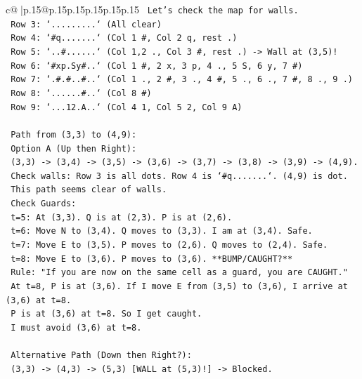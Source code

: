 \documentclass{article}
\begin{document}
{\begin{supertabular}{c@{$\;$}|p{.15\linewidth}@{}p{.15\linewidth}p{.15\linewidth}p{.15\linewidth}p{.15\linewidth}p{.15\linewidth}}
{{{\texttt{  Let's check the map for walls.} \\
\texttt{  Row 3: `.........` (All clear)} \\
\texttt{  Row 4: `\#q.......` (Col 1 \#, Col 2 q, rest .)} \\
\texttt{  Row 5: `..\#......` (Col 1,2 ., Col 3 \#, rest .) {-}> Wall at (3,5)!} \\
\texttt{  Row 6: `\#xp.Sy\#..` (Col 1 \#, 2 x, 3 p, 4 ., 5 S, 6 y, 7 \#)} \\
\texttt{  Row 7: `.\#.\#..\#..` (Col 1 ., 2 \#, 3 ., 4 \#, 5 ., 6 ., 7 \#, 8 ., 9 .)} \\
\texttt{  Row 8: `......\#..` (Col 8 \#)} \\
\texttt{  Row 9: `...12.A..` (Col 4 1, Col 5 2, Col 9 A)} \\
\\ 
\texttt{  Path from (3,3) to (4,9):} \\
\texttt{  Option A (Up then Right):} \\
\texttt{  (3,3) {-}> (3,4) {-}> (3,5) {-}> (3,6) {-}> (3,7) {-}> (3,8) {-}> (3,9) {-}> (4,9).} \\
\texttt{  Check walls: Row 3 is all dots. Row 4 is `\#q.......`. (4,9) is dot.} \\
\texttt{  This path seems clear of walls.} \\
\texttt{  Check Guards:} \\
\texttt{  t=5: At (3,3). Q is at (2,3). P is at (2,6).} \\
\texttt{  t=6: Move N to (3,4). Q moves to (3,3). I am at (3,4). Safe.} \\
\texttt{  t=7: Move E to (3,5). P moves to (2,6). Q moves to (2,4). Safe.} \\
\texttt{  t=8: Move E to (3,6). P moves to (3,6). **BUMP/CAUGHT?**} \\
\texttt{     Rule: "If you are now on the same cell as a guard, you are CAUGHT."} \\
\texttt{     At t=8, P is at (3,6). If I move E from (3,5) to (3,6), I arrive at (3,6) at t=8.} \\
\texttt{     P is at (3,6) at t=8. So I get caught.} \\
\texttt{     I must avoid (3,6) at t=8.} \\
\\ 
\texttt{  Alternative Path (Down then Right?):} \\
\texttt{  (3,3) {-}> (4,3) {-}> (5,3) {[}WALL at (5,3)!{]} {-}> Blocked.} \\
\\ 
}}}
\end{supertabular}}
\end{document}

